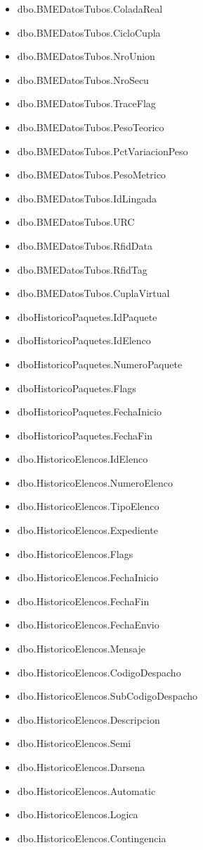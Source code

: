 \documentclass[]{article}
\begin{document}
\begin{itemize}[label=\textcolor{blue}{\textbullet}]
	\item dbo.BMEDatosTubos.ColadaReal
	\item dbo.BMEDatosTubos.CicloCupla
	\item dbo.BMEDatosTubos.NroUnion
	\item dbo.BMEDatosTubos.NroSecu
	\item dbo.BMEDatosTubos.TraceFlag
	\item dbo.BMEDatosTubos.PesoTeorico
	\item dbo.BMEDatosTubos.PctVariacionPeso
	\item dbo.BMEDatosTubos.PesoMetrico
	\item dbo.BMEDatosTubos.IdLingada
	\item dbo.BMEDatosTubos.URC
	\item dbo.BMEDatosTubos.RfidData
	\item dbo.BMEDatosTubos.RfidTag
	\item dbo.BMEDatosTubos.CuplaVirtual

	\item dboHistoricoPaquetes.IdPaquete
	\item dboHistoricoPaquetes.IdElenco
	\item dboHistoricoPaquetes.NumeroPaquete
	\item dboHistoricoPaquetes.Flags
	\item dboHistoricoPaquetes.FechaInicio
	\item dboHistoricoPaquetes.FechaFin

	\item dbo.HistoricoElencos.IdElenco
	\item dbo.HistoricoElencos.NumeroElenco
	\item dbo.HistoricoElencos.TipoElenco
	\item dbo.HistoricoElencos.Expediente
	\item dbo.HistoricoElencos.Flags
	\item dbo.HistoricoElencos.FechaInicio
	\item dbo.HistoricoElencos.FechaFin
	\item dbo.HistoricoElencos.FechaEnvio
	\item dbo.HistoricoElencos.Mensaje
	\item dbo.HistoricoElencos.CodigoDespacho
	\item dbo.HistoricoElencos.SubCodigoDespacho
	\item dbo.HistoricoElencos.Descripcion
	\item dbo.HistoricoElencos.Semi
	\item dbo.HistoricoElencos.Darsena
	\item dbo.HistoricoElencos.Automatic
	\item dbo.HistoricoElencos.Logica
	\item dbo.HistoricoElencos.Contingencia


\end{itemize}
\end{document}
